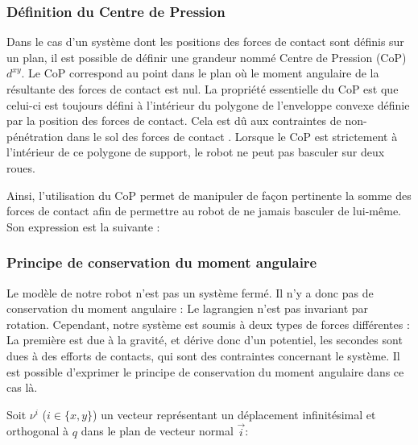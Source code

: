 			\subsubsection{Définition du Centre de Pression}
			
				Dans le cas d'un système dont les positions des forces de contact sont définis sur un plan, il est possible de définir une grandeur nommé Centre de Pression (CoP) $d^{xy}$.
				Le CoP correspond au point dans le plan où le moment angulaire de la résultante des forces de contact est nul.
				La propriété essentielle du CoP est que celui-ci est toujours défini à l'intérieur du polygone de l'enveloppe convexe définie par la position des forces de contact.
				Cela est dû aux contraintes de non-pénétration dans le sol des forces de contact .
				Lorsque le CoP est strictement à l'intérieur de ce polygone de support, le robot ne peut pas basculer sur deux roues.
				
				Ainsi, l'utilisation du CoP permet de manipuler de façon pertinente la somme des forces de contact afin de permettre au robot de ne jamais basculer de lui-même.
				Son expression est la suivante :
				
			
			\subsubsection{Principe de conservation du moment angulaire}
			
				Le modèle de notre robot n'est pas un système fermé. Il n'y a donc pas de conservation du moment angulaire : Le lagrangien n'est pas invariant par rotation.
				Cependant, notre système est soumis à deux types de forces différentes : La première est due à la gravité, et dérive donc d'un potentiel, les secondes sont dues à des efforts de contacts, qui sont des contraintes concernant le système.
				Il est possible d'exprimer le principe de conservation du moment angulaire dans ce cas là.
				
				Soit $\nu^i$ ($i\in\{x, y\}$) un vecteur représentant un déplacement infinitésimal et orthogonal à $q$ dans le plan de vecteur normal $\vec{i}$:
				
